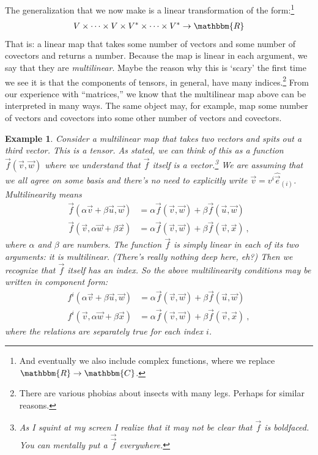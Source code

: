 \documentclass[
  11pt,
	colorful,
	raggedright,
]{tufte-style-thesis-flip}
\newtheorem{example}{Example}[section]
\begin{document}
The generalization that we now make is a linear transformation of the form:\footnote{And eventually we also include complex functions, where we replace $\mathbbm{R}\to \mathbbm{C}$. }
\begin{align}
  V\times \cdots \times V \times V^* \times\cdots\times V^* \to \mathbbm{R}
\end{align}
That is: a linear map that takes some number of vectors and some number of covectors and returns a number. Because the map is linear in each argument, we say that they are \emph{multilinear}. Maybe the reason why this is `scary' the first time we see it is that the components of tensors, in general, have many indices.\footnote{There are various phobias about insects with many legs. Perhaps for similar reasons.} From our experience with ``matrices,'' we know that the multilinear map above can be interpreted in many ways. The same object may, for example, map some number of vectors and covectors into some other number of vectors and covectors.



\begin{example} \label{eg:multilinear:2vec:to:1vec}
Consider a multilinear map that takes two vectors and spits out a third vector. This is a tensor. As stated, we can think of this as a function $\vec{f}(\vec{v},\vec{w})$ where we understand that $\vec{f}$ itself is a vector.\footnote{As I squint at my screen I realize that it may not be clear that $\vec{f}$ is boldfaced. You can mentally put a $\overrightarrow{\vec{f}}$ everywhere.} We are assuming that we all agree on some basis and there's no need to explicitly write $\vec{v}=v^i\hat{\vec{e}}_{(i)}$. Multilinearity means
\begin{align}
  \vec{f}(\alpha\vec{v}+\beta\vec{u},\vec{w}) &= 
  \alpha\vec{f}(\vec{v},\vec{w}) +
  \beta \vec{f}(\vec{u},\vec{w})
  \\
  \vec{f}(\vec{v},\alpha\vec{w}+\beta\vec{x}) &= 
  \alpha\vec{f}(\vec{v},\vec{w}) +
  \beta \vec{f}(\vec{v},\vec{x}) \ ,
\end{align}
where $\alpha$ and $\beta$ are numbers. The function $\vec{f}$ is simply linear in each of its two arguments: it is \emph{multi}linear. (There's really nothing deep here, eh?) Then we recognize that $\vec{f}$ itself has an index. So the above multilinearity conditions may be written in component form:
\begin{align}
  f^i(\alpha\vec{v}+\beta\vec{u},\vec{w}) &= 
  \alpha\vec{f}(\vec{v},\vec{w}) +
  \beta \vec{f}(\vec{u},\vec{w})
  \\
  f^i(\vec{v},\alpha\vec{w}+\beta\vec{x}) &= 
  \alpha\vec{f}(\vec{v},\vec{w}) +
  \beta \vec{f}(\vec{v},\vec{x}) \ ,
\end{align}
where the relations are separately true for each index $i$. 
\end{example}
\end{document}
